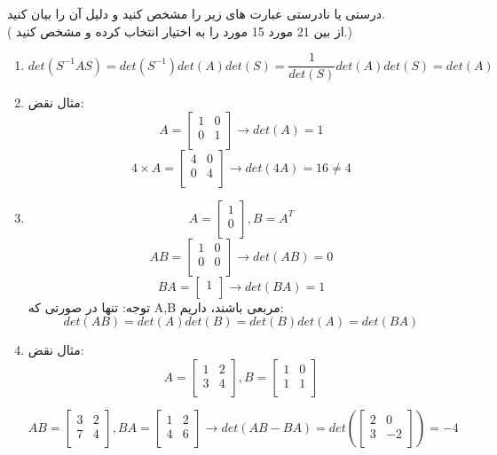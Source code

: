 \documentclass{article}
\begin{document}
\clearpage
{}درستی یا نادرستی عبارت های زیر را مشخص کنید و دلیل آن را بیان کنید.
\\
(
از بین 21 مورد  15 مورد را به اختیار انتخاب کرده و مشخص کنید.)

\begin{enumerate}[label=\alph*)]
	
	\item 
	$$det (S^{-1}AS)  = det(S^{-1}) det (A) det(S) = \frac{1}{det(S) }det(A) det(S) = det(A)$$
	\item 
	مثال نقض:
	$$A = \begin{bmatrix}
	1& 0 \\
	0 &  1\\
	\end{bmatrix} \rightarrow det(A) = 1$$
	$$ 4 \times A = \begin{bmatrix}
	4& 0 \\
	0 &  4\\
	\end{bmatrix}  \rightarrow det(4A) = 16 \ne 4$$
	\item 
	$$A = \begin{bmatrix}
	1\\
	0\\
	\end{bmatrix} , B = A^{T}  $$
	$$AB = \begin{bmatrix}
	1 & 0\\
	0 & 0\\
	\end{bmatrix} \rightarrow det(AB) = 0$$
	$$BA = \begin{bmatrix}
	1 \\
	\end{bmatrix} \rightarrow det(BA) = 1$$
	توجه: تنها در صورتی که A,B مربعی باشند، داریم:
	$$ det(AB) = det(A) det(B) = det(B) det(A) = det(BA)$$
	
	\item 
	مثال نقض:
	$$A = \begin{bmatrix}
	1 &2\\
	3 & 4 \\
	\end{bmatrix} , B =\begin{bmatrix}
	1 &0\\
	1 & 1 \\
	\end{bmatrix}  $$
	
	$$AB = \begin{bmatrix}
	3 &2\\
	7 & 4 \\
	\end{bmatrix} , BA =\begin{bmatrix}
	1 &2\\
	4 & 6 \\
	\end{bmatrix}  \rightarrow det(AB-BA) = det(\begin{bmatrix}
	2 &0\\
	3 & -2 \\
	\end{bmatrix}) = -4 $$
	

\end{enumerate}
\end{document}
